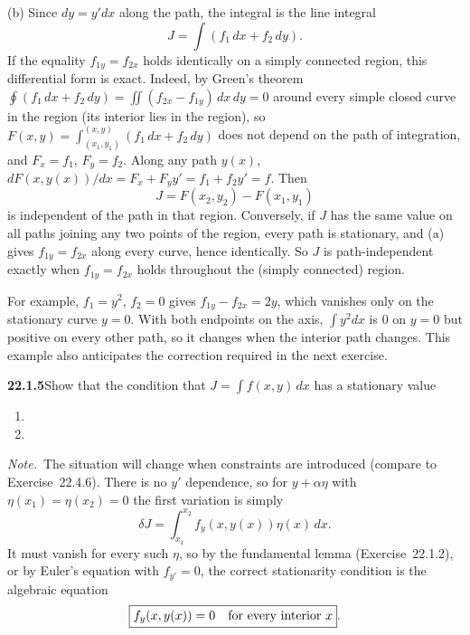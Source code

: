 (b) Since $dy=y'dx$ along the path, the integral is the line integral
\[
J=\int(f_1\,dx+f_2\,dy).
\]
If the equality $f_{1y}=f_{2x}$ holds identically on a simply
connected region, this differential form is exact. Indeed, by Green's
theorem
$\oint(f_1\,dx+f_2\,dy)=\iint(f_{2x}-f_{1y})\,dx\,dy=0$ around every
simple closed curve in the region (its interior lies in the region),
so $F(x,y)=\int_{(x_1,y_1)}^{(x,y)}(f_1\,dx+f_2\,dy)$ does not depend
on the path of integration, and $F_x=f_1$, $F_y=f_2$. Along any path
$y(x)$, $dF(x,y(x))/dx=F_x+F_yy'=f_1+f_2y'=f$. Then
\[
\boxed{J=F(x_2,y_2)-F(x_1,y_1)}
\]
is independent of the path in that region. Conversely, if $J$ has the
same value on all paths joining any two points of the region, every
path is stationary, and (a) gives $f_{1y}=f_{2x}$ along every curve,
hence identically. So $J$ is path-independent exactly when
$f_{1y}=f_{2x}$ holds throughout the (simply connected) region.

For example, $f_1=y^2$, $f_2=0$ gives $f_{1y}-f_{2x}=2y$, which
vanishes only on the stationary curve $y=0$. With both endpoints on the
axis, $\int y^2dx$ is $0$ on $y=0$ but positive on every other path,
so it changes when the interior path changes. This example
also anticipates the correction required in the next exercise.


\par\bigskip
\noindent\textbf{22.1.5}\quad Show that the condition that
$J=\displaystyle\int f(x,y)\,dx$ has a stationary value
\begin{enumerate}
\item[(a)] 
\item[(b)] 
\end{enumerate}
\par\emph{Note.}~The situation will change when constraints are
introduced (compare to Exercise~22.4.6).
\solution
There is no $y'$ dependence, so for $y+\alpha\eta$ with
$\eta(x_1)=\eta(x_2)=0$ the first variation is simply
\[
\delta J=\int_{x_1}^{x_2}f_y(x,y(x))\eta(x)\,dx.
\]
It must vanish for every such $\eta$, so by the fundamental lemma
(Exercise~22.1.2), or by Euler's equation with $f_{y'}=0$, the correct
stationarity condition is the algebraic equation
\[
\boxed{f_y(x,y(x))=0\quad\hbox{for every interior }x}.
\]

